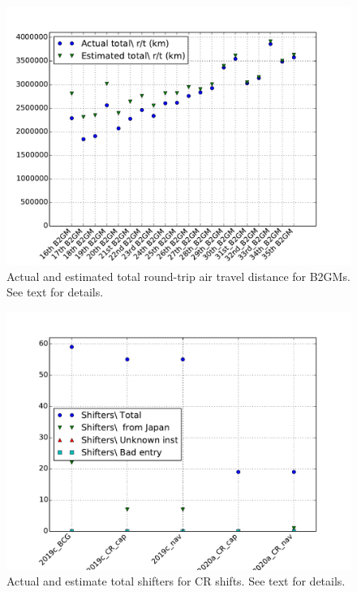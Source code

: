 \documentclass[12pt]{article}
\begin{document}
 \begin{figure}[htbp]
\begin{center}
\includegraphics[width=\textwidth]{../FIGURES/B2GM_r-t.pdf}
\caption{Actual and estimated total round-trip air travel distance for B2GMs. See text for details.}
\label{fig:B2GM_r-t}
\end{center}
\end{figure}

\begin{figure}[htbp]
\begin{center}
\includegraphics[width=\textwidth]{../FIGURES/Shifts_Shifters.pdf}
\caption{Actual and estimate total shifters for CR shifts. See text for details.}
\label{fig:Shifts_shifters}
\end{center}
\end{figure}
\end{document}
